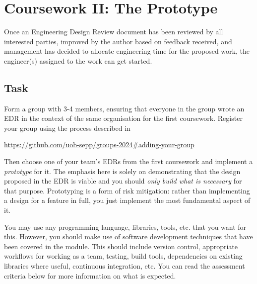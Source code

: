 
\clearpage
\section{Coursework II: The Prototype}

Once an Engineering Design Review document has been reviewed by all interested parties, improved by the author based on feedback received, and management has decided to allocate engineering time for the proposed work, the engineer(s) assigned to the work can get started.

\subsection{Task}

Form a group with 3-4 members, ensuring that everyone in the group wrote an EDR in the context of the same organisation for the first coursework. Register your group using the process described in

\begin{center}
    \url{https://github.com/uob-sepp/groups-2024#adding-your-group}
\end{center}

Then choose one of your team's EDRs from the first coursework and implement a \emph{prototype} for it. The emphasis here is solely on demonstrating that the design proposed in the EDR is viable and you should \emph{only build what is necessary} for that purpose. Prototyping is a form of risk mitigation: rather than implementing a design for a feature in full, you just implement the most fundamental aspect of it.

You may use any programming language, libraries, tools, etc. that you want for this. However, you should make use of software development techniques that have been covered in the module. This should include version control, appropriate workflows for working as a team, testing, build tools, dependencies on existing libraries where useful, continuous integration, etc. You can read the assessment criteria below for more information on what is expected.

